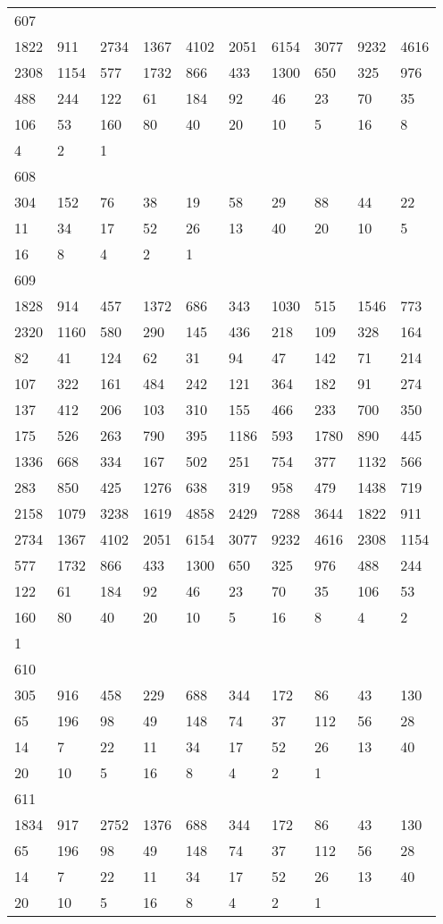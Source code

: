 \begin{longtable}{*{10}{l}}
607&&&&&&&&&\\
1822& 911& 2734& 1367& 4102& 2051& 6154& 3077& 9232& 4616\\
2308& 1154& 577& 1732& 866& 433& 1300& 650& 325& 976\\
488& 244& 122& 61& 184& 92& 46& 23& 70& 35\\
106& 53& 160& 80& 40& 20& 10& 5& 16& 8\\
4& 2& 1& \\

608&&&&&&&&&\\
304& 152& 76& 38& 19& 58& 29& 88& 44& 22\\
11& 34& 17& 52& 26& 13& 40& 20& 10& 5\\
16& 8& 4& 2& 1& \\

609&&&&&&&&&\\
1828& 914& 457& 1372& 686& 343& 1030& 515& 1546& 773\\
2320& 1160& 580& 290& 145& 436& 218& 109& 328& 164\\
82& 41& 124& 62& 31& 94& 47& 142& 71& 214\\
107& 322& 161& 484& 242& 121& 364& 182& 91& 274\\
137& 412& 206& 103& 310& 155& 466& 233& 700& 350\\
175& 526& 263& 790& 395& 1186& 593& 1780& 890& 445\\
1336& 668& 334& 167& 502& 251& 754& 377& 1132& 566\\
283& 850& 425& 1276& 638& 319& 958& 479& 1438& 719\\
2158& 1079& 3238& 1619& 4858& 2429& 7288& 3644& 1822& 911\\
2734& 1367& 4102& 2051& 6154& 3077& 9232& 4616& 2308& 1154\\
577& 1732& 866& 433& 1300& 650& 325& 976& 488& 244\\
122& 61& 184& 92& 46& 23& 70& 35& 106& 53\\
160& 80& 40& 20& 10& 5& 16& 8& 4& 2\\
1& \\

610&&&&&&&&&\\
305& 916& 458& 229& 688& 344& 172& 86& 43& 130\\
65& 196& 98& 49& 148& 74& 37& 112& 56& 28\\
14& 7& 22& 11& 34& 17& 52& 26& 13& 40\\
20& 10& 5& 16& 8& 4& 2& 1& \\

611&&&&&&&&&\\
1834& 917& 2752& 1376& 688& 344& 172& 86& 43& 130\\
65& 196& 98& 49& 148& 74& 37& 112& 56& 28\\
14& 7& 22& 11& 34& 17& 52& 26& 13& 40\\
20& 10& 5& 16& 8& 4& 2& 1& \\


\end{longtable}
